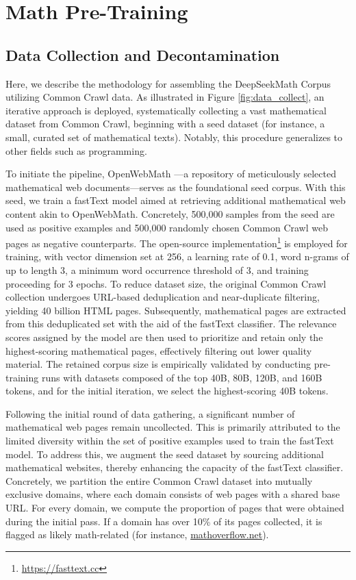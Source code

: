 \section{Math Pre-Training}

\subsection{Data Collection and Decontamination} Here, we describe the methodology for assembling the DeepSeekMath Corpus utilizing Common Crawl data. As illustrated in Figure \ref{fig:data_collect}, an iterative approach is deployed, systematically collecting a vast mathematical dataset from Common Crawl, beginning with a seed dataset (for instance, a small, curated set of mathematical texts). Notably, this procedure generalizes to other fields such as programming.

To initiate the pipeline, OpenWebMath \citep{openwebmath}—a repository of meticulously selected mathematical web documents—serves as the foundational seed corpus. With this seed, we train a fastText model \citep{joulin2016fasttext} aimed at retrieving additional mathematical web content akin to OpenWebMath. Concretely, 500,000 samples from the seed are used as positive examples and 500,000 randomly chosen Common Crawl web pages as negative counterparts. The open-source implementation\footnote{\url{https://fasttext.cc}} is employed for training, with vector dimension set at 256, a learning rate of 0.1, word n-grams of up to length 3, a minimum word occurrence threshold of 3, and training proceeding for 3 epochs. To reduce dataset size, the original Common Crawl collection undergoes URL-based deduplication and near-duplicate filtering, yielding 40 billion HTML pages. Subsequently, mathematical pages are extracted from this deduplicated set with the aid of the fastText classifier. The relevance scores assigned by the model are then used to prioritize and retain only the highest-scoring mathematical pages, effectively filtering out lower quality material. The retained corpus size is empirically validated by conducting pre-training runs with datasets composed of the top 40B, 80B, 120B, and 160B tokens, and for the initial iteration, we select the highest-scoring 40B tokens.

Following the initial round of data gathering, a significant number of mathematical web pages remain uncollected. This is primarily attributed to the limited diversity within the set of positive examples used to train the fastText model. To address this, we augment the seed dataset by sourcing additional mathematical websites, thereby enhancing the capacity of the fastText classifier. Concretely, we partition the entire Common Crawl dataset into mutually exclusive domains, where each domain consists of web pages with a shared base URL. For every domain, we compute the proportion of pages that were obtained during the initial pass. If a domain has over 10\% of its pages collected, it is flagged as likely math-related (for instance, \url{mathoverflow.net}). 

